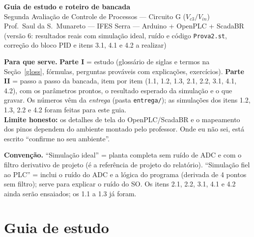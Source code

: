 \documentclass[11pt,a4paper]{article}
\newcommand{\Vc}[1]{V_{c#1}}
\newcommand{\Vin}{V_{in}}
\begin{document}
\begin{center}
{\LARGE\bfseries Guia de estudo e roteiro de bancada}\\[4pt]
{\Large Segunda Avaliação de Controle de Processos --- Circuito G ($\Vc3/\Vin$)}\\[6pt]
Prof.\ Saul da S.\ Munareto --- IFES Serra --- Arduino + OpenPLC + ScadaBR\\ (versão 6: resultados reais com simulação ideal, ruído e código \texttt{Prova2.st}, correção do bloco PID e itens 3.1, 4.1 e 4.2 a realizar)
\end{center}
\begin{tcolorbox}[colback=gray!6,colframe=gray!60]
\textbf{Para que serve.} \textbf{Parte I} = estudo (glossário de siglas e termos na Seção~\ref{gloss}, fórmulas, perguntas prováveis com explicações, exercícios). \textbf{Parte II} = passo a passo da bancada, item por item (1.1, 1.2, 1.3, 2.1, 2.2, 3.1, 4.1, 4.2), com os parâmetros prontos, o resultado esperado da simulação e o que gravar. Os números vêm da \emph{entrega} (pasta \texttt{entrega/}); as simulações dos itens 1.2, 1.3, 2.2 e 4.2 foram feitas para este guia.\\
\textbf{Limite honesto:} os detalhes de tela do OpenPLC/ScadaBR e o mapeamento dos pinos dependem do ambiente montado pelo professor. Onde eu não sei, está escrito ``confirme no seu ambiente''.
\end{tcolorbox}
\begin{tcolorbox}[colback=gray!6,colframe=gray!60]\textbf{Convenção.} ``Simulação ideal'' = planta completa sem ruído de ADC e com o filtro derivativo de projeto (é a referência de projeto do relatório). ``Simulação fiel ao PLC'' = inclui o ruído do ADC e a lógica do programa (derivada de 4 pontos sem filtro); serve para explicar o ruído do SO. Os itens 2.1, 2.2, 3.1, 4.1 e 4.2 ainda serão ensaiados; os 1.1 a 1.3 já foram.\end{tcolorbox}
\tableofcontents
\newpage

\part{Guia de estudo}
\end{document}
